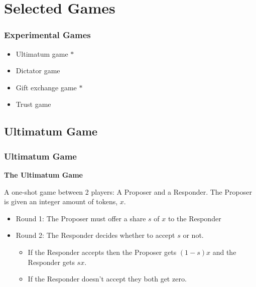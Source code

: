 \documentclass{beamer}
\begin{document}
\section{Selected Games}


\begin{frame}
	\frametitle{Experimental Games}
	\begin{itemize}
		\item Ultimatum game $\ast$ 
		\item Dictator game
		\item Gift exchange game $\ast$		
		\item Trust game
	\end{itemize}
\end{frame}

\subsection{Ultimatum Game}


\begin{frame}
	\frametitle{Ultimatum Game}
	\textbf{The Ultimatum Game}
	
	A one-shot game between 2 players: A Proposer and a Responder. The Proposer is given an integer amount of tokens, $x$.
	
	\begin{itemize}
		\item Round 1: The Proposer must offer a share $s$ of $x$ to the Responder
		\item Round 2: The Responder decides whether to accept $s$ or not. 
		\begin{itemize}
			\item If the Responder accepts then the Proposer gets $\left(1 - s\right)x$ and the Responder gets $sx$.
			\item If the Responder doesn't accept they both get zero.
		\end{itemize}
	\end{itemize}
	
\end{frame}
\end{document}
